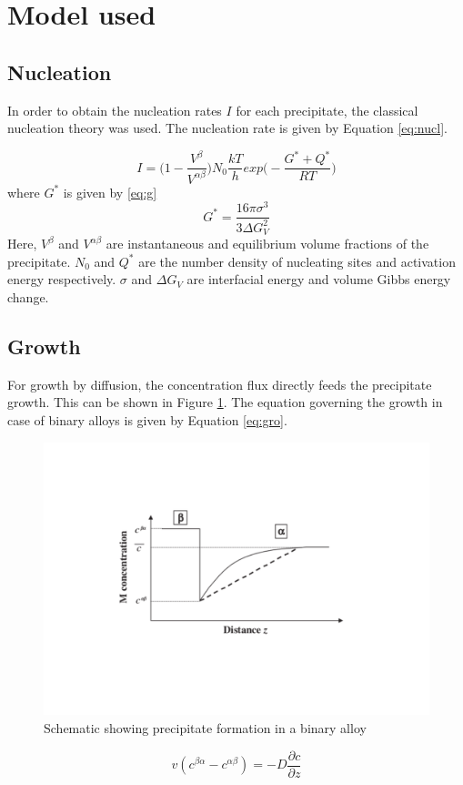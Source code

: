 \documentclass[12pt]{article}
\begin{document}
\section{Model used}
\subsection{Nucleation}
In order to obtain the nucleation rates $I$ for each precipitate, the classical nucleation theory was used. The nucleation rate is given by Equation \ref{eq:nucl}.

\begin{equation}
I=\bigg(1-\frac{V^\beta}{V^{\alpha \beta}}\bigg)N_0\frac{kT}{h}exp\bigg(-\frac{G^*+Q^*}{RT}\bigg)
\label{eq:nucl}
\end{equation}
where $G^*$ is given by \ref{eq:g}
\begin{equation}
G^*=\frac{16\pi \sigma^3}{3\Delta G_V^2}
\label{eq:g}
\end{equation}
Here, $V^\beta$ and $V^{\alpha \beta}$ are instantaneous and equilibrium volume fractions of the precipitate. $N_0$ and $Q^*$ are the number density of nucleating sites and activation energy respectively. $\sigma$ and $\Delta G_V$ are interfacial energy and volume Gibbs energy change. 

\subsection{Growth}

For growth by diffusion, the concentration flux directly feeds the precipitate growth. This can be shown in Figure \ref{fig:prec_g}. The equation governing the growth in case of binary alloys is given by Equation \ref{eq:gro}. 

\begin{figure}
\centering
\includegraphics[width=14cm]{prec.pdf}
\caption{Schematic showing precipitate formation in a binary alloy}
\label{fig:prec_g}
\end{figure}
\begin{equation}
v(c^{\beta \alpha}-c^{\alpha \beta})=-D\frac{\partial c}{\partial z}
\label{eq:gro}
\end{equation}
 
\end{document}
